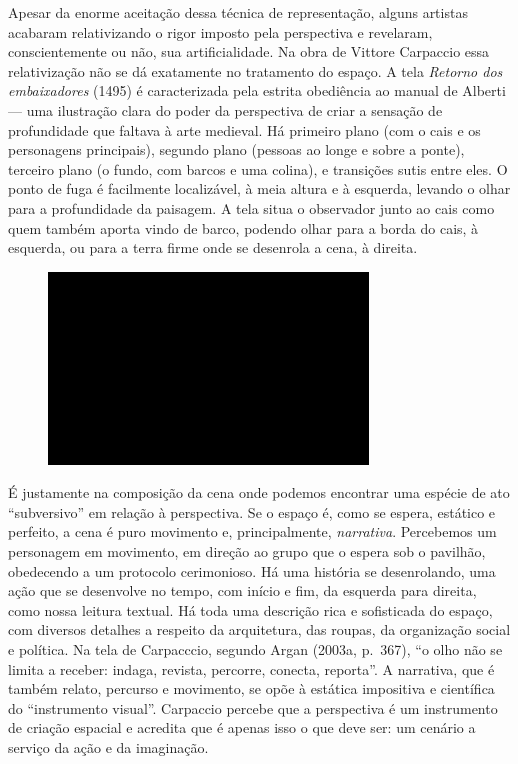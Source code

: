 Apesar da enorme aceitação dessa técnica de representação, alguns artistas acabaram relativizando o rigor
imposto pela perspectiva e revelaram, conscientemente ou não, sua
artificialidade. Na obra de Vittore Carpaccio essa relativização não se
dá exatamente no tratamento do espaço. A tela \emph{Retorno dos
embaixadores} (1495) é caracterizada pela estrita obediência ao manual
de Alberti --- uma ilustração clara do poder da perspectiva de criar a
sensação de profundidade que faltava à arte medieval. Há primeiro plano
(com o cais e os personagens principais), segundo plano (pessoas ao
longe e sobre a ponte), terceiro plano (o fundo, com barcos e uma
colina), e transições sutis entre eles. O ponto de fuga é facilmente
localizável, à meia altura e à esquerda, levando o olhar para a
profundidade da paisagem. A tela situa o observador junto ao cais como
quem também aporta vindo de barco, podendo olhar para a borda do cais, à
esquerda, ou para a terra firme onde se desenrola a cena, à direita.

\begin{figure}[!ht]

\centering
 \includegraphics[width=85mm]{./imgs/im1.jpg}
\caption{\tiny{}}

\end{figure}

É justamente na composição da cena onde podemos encontrar uma espécie de
ato ``subversivo'' em relação à perspectiva. Se o espaço é, como se
espera, estático e perfeito, a cena é puro movimento e, principalmente,
\emph{narrativa}. Percebemos um personagem em movimento, em direção ao
grupo que o espera sob o pavilhão, obedecendo a um protocolo
cerimonioso. Há uma história se desenrolando, uma ação que se desenvolve
no tempo, com início e fim, da esquerda para direita, como nossa leitura
textual. Há toda uma descrição rica e sofisticada do espaço, com
diversos detalhes a respeito da arquitetura, das roupas, da organização
social e política. Na tela de Carpacccio, segundo Argan (2003a, p.~367),
``o olho não se limita a receber: indaga, revista, percorre, conecta,
reporta''. A narrativa, que é também relato, percurso e movimento, se
opõe à estática impositiva e científica do ``instrumento visual''.
Carpaccio percebe que a perspectiva é um instrumento de
criação espacial e acredita que é apenas isso o que deve ser: um cenário
a serviço da ação e da imaginação.

